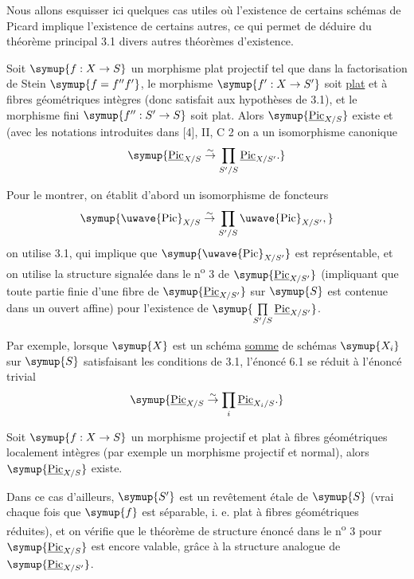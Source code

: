 
Nous allons esquisser ici quelques cas utiles où l'existence de certains
schémas de Picard implique l'existence de certains autres, ce qui permet de
déduire du théorème principal 3.1 divers autres théorèmes d'existence.

 Soit $\symup{f:X\to S}$ un morphisme plat
projectif tel que dans la factorisation de Stein $\symup{f=f''f'}$, le morphisme
$\symup{f':X\to S'}$ soit \uline{plat} et à fibres géométriques intègres (donc
satisfait aux hypothèses de 3.1), et le morphisme fini
$\symup{f'':S'\to S}$ soit plat. Alors $\symup{\underline{\operatorname{Pic}}_{X/S}}$ existe et
(avec les notations introduites dans [4], II, C 2 on a un isomorphisme
canonique
\[
\symup{\underline{\operatorname{Pic}}_{X/S}\overset{\sim}{\to}
\prod\limits_{S'/S}\underline{\operatorname{Pic}}_{X/S'}.}
\]

Pour le montrer, on établit d'abord un isomorphisme de foncteurs
\[
\symup{\text{\uwave{Pic}}_{X/S}\overset{\sim}{\to}
\prod\limits_{S'/S}\text{\uwave{Pic}}_{X/S'},}
\]
on utilise 3.1, qui implique que $\symup{\text{\uwave{Pic}}_{X/S'}}$ est représentable,
et on utilise la structure signalée dans le n\textsuperscript{o} 3 de
$\symup{\underline{\operatorname{Pic}}_{X/S'}}$ (impliquant que toute partie finie d'une fibre de
$\symup{\underline{\operatorname{Pic}}_{X/S'}}$ sur $\symup{S}$ est contenue dans un ouvert affine) pour
l'existence de $\symup{\prod\limits_{S'/S}\underline{\operatorname{Pic}}_{X/S'}}$.

Par exemple, lorsque $\symup{X}$ est un schéma \uline{somme} de schémas $\symup{X_i}$ sur $\symup{S}$
satisfaisant les conditions de 3.1, l'énoncé 6.1 se réduit à l'énoncé trivial
\[
\symup{\underline{\operatorname{Pic}}_{X/S}\overset{\sim}{\to}
\prod\limits_i\underline{\operatorname{Pic}}_{X_i/S}.}
\]

 Soit $\symup{f:X\to S}$ un morphisme projectif et
plat à fibres géométriques localement intègres (par exemple un morphisme
projectif et normal), alors $\symup{\underline{\operatorname{Pic}}_{X/S}}$ existe.

Dans ce cas d'ailleurs, $\symup{S'}$ est un revêtement étale de $\symup{S}$ (vrai chaque fois
que $\symup{f}$ est séparable, i. e. plat à fibres géométriques réduites), et on vérifie
que le théorème de structure énoncé dans le n\textsuperscript{o} 3 pour
$\symup{\underline{\operatorname{Pic}}_{X/S}}$ est encore valable, grâce à la structure analogue
de $\symup{\underline{\operatorname{Pic}}_{X/S'}}$.

